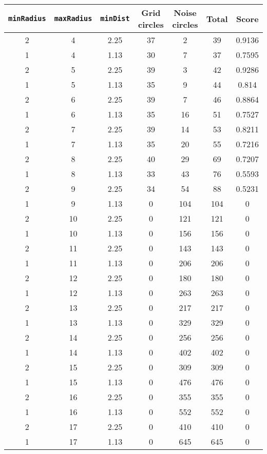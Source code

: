 \documentclass[letterpaper, 12pt]{article}
\begin{document}
\begin{longtable}{|c|c|c|c|c|c|c|}
\hline
\textbf{\texttt{minRadius}} & \textbf{\texttt{maxRadius}} & \textbf{\texttt{minDist}} & \textbf{Grid circles} & \textbf{Noise circles} & \textbf{Total} & \textbf{Score} \\
\hline
2 & 4 & 2.25 & 37 & 2 & 39 & 0.9136 \\
\hline
1 & 4 & 1.13 & 30 & 7 & 37 & 0.7595 \\
\hline
2 & 5 & 2.25 & 39 & 3 & 42 & 0.9286 \\
\hline
1 & 5 & 1.13 & 35 & 9 & 44 & 0.814 \\
\hline
2 & 6 & 2.25 & 39 & 7 & 46 & 0.8864 \\
\hline
1 & 6 & 1.13 & 35 & 16 & 51 & 0.7527 \\
\hline
2 & 7 & 2.25 & 39 & 14 & 53 & 0.8211 \\
\hline
1 & 7 & 1.13 & 35 & 20 & 55 & 0.7216 \\
\hline
2 & 8 & 2.25 & 40 & 29 & 69 & 0.7207 \\
\hline
1 & 8 & 1.13 & 33 & 43 & 76 & 0.5593 \\
\hline
2 & 9 & 2.25 & 34 & 54 & 88 & 0.5231 \\
\hline
1 & 9 & 1.13 & 0 & 104 & 104 & 0 \\
\hline
2 & 10 & 2.25 & 0 & 121 & 121 & 0 \\
\hline
1 & 10 & 1.13 & 0 & 156 & 156 & 0 \\
\hline
2 & 11 & 2.25 & 0 & 143 & 143 & 0 \\
\hline
1 & 11 & 1.13 & 0 & 206 & 206 & 0 \\
\hline
2 & 12 & 2.25 & 0 & 180 & 180 & 0 \\
\hline
1 & 12 & 1.13 & 0 & 263 & 263 & 0 \\
\hline
2 & 13 & 2.25 & 0 & 217 & 217 & 0 \\
\hline
1 & 13 & 1.13 & 0 & 329 & 329 & 0 \\
\hline
2 & 14 & 2.25 & 0 & 256 & 256 & 0 \\
\hline
1 & 14 & 1.13 & 0 & 402 & 402 & 0 \\
\hline
2 & 15 & 2.25 & 0 & 309 & 309 & 0 \\
\hline
1 & 15 & 1.13 & 0 & 476 & 476 & 0 \\
\hline
2 & 16 & 2.25 & 0 & 355 & 355 & 0 \\
\hline
1 & 16 & 1.13 & 0 & 552 & 552 & 0 \\
\hline
2 & 17 & 2.25 & 0 & 410 & 410 & 0 \\
\hline
1 & 17 & 1.13 & 0 & 645 & 645 & 0 \\

\end{longtable}
\end{document}
